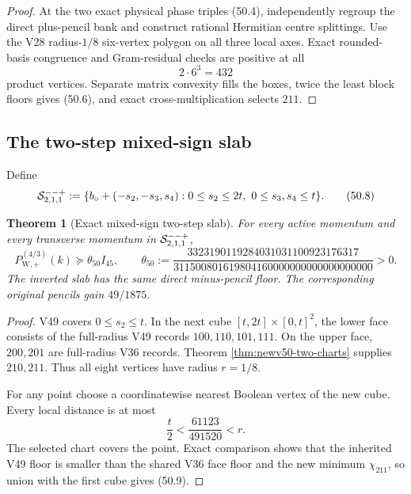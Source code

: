 \documentclass[11pt,oneside]{article}
\newtheorem{theorem}{Theorem}[section]
\theoremstyle{definition}
\theoremstyle{remark}
\begin{document}
\begin{proof}
At the two exact physical phase triples (50.4), independently
regroup the direct plus-pencil bank and construct rational Hermitian
centre splittings.  Use the V28 radius-\(1/8\) six-vertex polygon on
all three local axes.  Exact rounded-basis congruence and
Gram-residual checks are positive at all
\[
 2\cdot6^3=432                                         \tag{50.7}
\]
product vertices.  Separate matrix convexity fills the boxes,
twice the least block floors gives (50.6), and exact
cross-multiplication selects \(211\).
\end{proof}

\subsection{The two-step mixed-sign slab}

Define
\[
 {\cal S}_{2,1,1}^{--+}:=
 \{b_\circ+(-s_2,-s_3,s_4):
      0\le s_2\le2t,\ 0\le s_3,s_4\le t\}.            \tag{50.8}
\]

\begin{theorem}[Exact mixed-sign two-step slab]
\label{thm:newv50-mixed-slab}
For every active momentum and every transverse momentum in
\({\cal S}_{2,1,1}^{--+}\),
\[
 P_{\mathrm W,+}^{(4/3)}(k)
 \succeq\theta_{50}I_{45},\qquad
 \theta_{50}:=
 \frac{3323190119284031031100923176317}
 {311500801619804160000000000000000000}>0.             \tag{50.9}
\]
The inverted slab has the same direct minus-pencil floor.  The
corresponding original pencils gain \(49/1875\).
\end{theorem}

\begin{proof}
V49 covers \(0\le s_2\le t\).  In the next cube
\([t,2t]\times[0,t]^2\), the lower face consists of the
full-radius V49 records \(100,110,101,111\).  On the upper face,
\(200,201\) are full-radius V36 records.  Theorem
\ref{thm:newv50-two-charts} supplies \(210,211\).  Thus all eight
vertices have radius \(r=1/8\).

For any point choose a coordinatewise nearest Boolean vertex of the
new cube.  Every local distance is at most
\[
 \frac t2<\frac{61123}{491520}<r.                     \tag{50.10}
\]
The selected chart covers the point.  Exact comparison shows that
the inherited V49 floor is smaller than the shared V36 face floor
and the new minimum \(\chi_{211}\), so union with the first cube
gives (50.9).
\end{proof}
\end{document}
